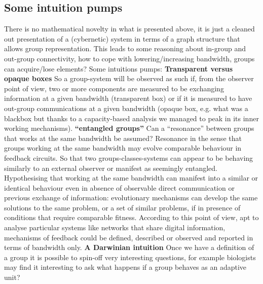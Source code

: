 \documentclass[14pt]{extarticle}
\begin{document}
\subsection*{Some intuition pumps}
\label{subsec:cyb_pumps}
\hspace*{15mm}There is no mathematical novelty in what is presented above, it is just a cleaned out presentation of a (cybernetic) system in terms of a graph structure that allows group representation. This leads to some reasoning about in-group and out-group connectivity, how to cope with lowering/increasing bandwidth, groups can acquire/lose elements? Some intuitions pumps:
\newline
\hspace*{7.5mm}\textbf{Transparent versus opaque boxes}
\newline
So a group-system will be observed as such if, from the observer point of view, two or more components are measured to be exchanging information at a given bandwidth (transparent box) or if it is measured to have out-group communications at a given bandwidth (opaque box, e.g. what was a blackbox but thanks to a capacity-based analysis we managed to peak in its inner working mechanisms).
\newline
\hspace*{7.5mm}\textbf{“entangled groups”}
\newline
Can a “resonance” between groups that works at the same bandwidth be assumed? Resonance in the sense that groups working at the same bandwidth may evolve comparable behaviour in feedback circuits. So that two groups-classes-systems can appear to be behaving similarly to an external observer or manifest as seemingly entangled. Hypothesising that working at the same bandwidth can manifest into a similar or identical behaviour even in absence of observable direct communication or previous exchange of information: evolutionary mechanisms can develop the same solutions to the same problem, or a set of similar problems, if in presence of conditions that require comparable fitness. According to this point of view, apt to analyse particular systems like networks that share digital information, mechanisms of feedback could be defined, described or observed and reported in terms of bandwidth only.
\newline
\hspace*{7.5mm}\textbf{A Darwinian intuition}
\newline
Once we have a definition of a group it is possible to spin-off very interesting questions, for example biologists may find it interesting to ask what happens if a group behaves as an adaptive unit?
\end{document}
